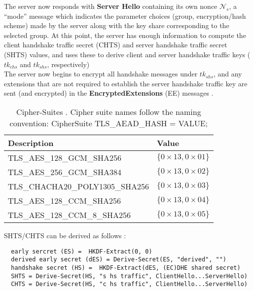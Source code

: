 The server now responds with \textbf{Server Hello} containing its own nonce $\mathcal{N}_s$, a ``mode'' message which
indicates the parameter choices (group, encryption/hash scheme) made by the server along with the key share corresponding to the selected group. At this point, the server has enough information to compute the client handshake traffic secret (CHTS) and server handshake traffic secret (SHTS) values, and uses these to derive client and server handshake traffic keys ($tk_{chs}$ and $tk_{shs}$, respectively) \\ The server now begins to encrypt all handshake messages under $tk_{shs}$, and any extensions that
are not required to establish the server handshake traffic key are sent (and encrypted) in the \textbf{EncryptedExtensions} (EE) messages \cite{10.1145/2810103.2813653}.

\begin{table}[t]
  \centering
  \begin{tabular}{|l|l|}
    \hline Description & Value \\
    \hline 
    TLS\_AES\_128\_GCM\_SHA256 & $\{0\times13,0\times01\}$ \\
    \hline TLS\_AES\_256\_GCM\_SHA384 & $\{0\times13,0\times02\}$ \\
    \hline TLS\_CHACHA20\_POLY1305\_SHA256 & $\{0\times13,0\times03\}$ \\
    \hline TLS\_AES\_128\_CCM\_SHA256 & $\{0\times13,0\times04\}$ \\
    \hline TLS\_AES\_128\_CCM\_8\_SHA256 & $\{0\times13,0\times05\}$ \\
    \hline
  \end{tabular}
  \caption{Cipher-Suites \cite{rfc8446}. Cipher suite names follow the naming convention: CipherSuite TLS\_AEAD\_HASH = VALUE;}
  \label{tab:ciphersuites}
\end{table}

SHTS/CHTS can be derived as follows \cite{rfc8446}:
  \begin{verbatim}
  early sercret (ES) =  HKDF-Extract(0, 0)
  derived early secret (dES) = Derive-Secret(ES, "derived", "")
  handshake secret (HS) =  HKDF-Extract(dES, (EC)DHE shared secret)
  SHTS = Derive-Secret(HS, "s hs traffic", ClientHello...ServerHello)
  CHTS = Derive-Secret(HS, "c hs traffic", ClientHello...ServerHello)
  \end{verbatim}

